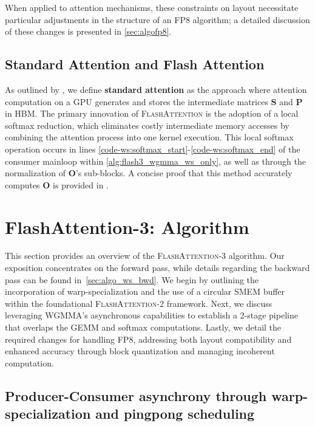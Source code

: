 When applied to attention mechanisms, these constraints on layout necessitate particular adjustments in the structure of an FP8 algorithm; a detailed discussion of these changes is presented in \cref{sec:algofp8}.

\subsection{Standard Attention and Flash Attention} As outlined by \citet{dao2022flashattention}, we define \textbf{standard attention} as the approach where attention computation on a GPU generates and stores the intermediate matrices $\mathbf{S}$ and $\mathbf{P}$ in HBM. The primary innovation of \textsc{FlashAttention} is the adoption of a local softmax reduction, which eliminates costly intermediate memory accesses by combining the attention process into one kernel execution. This local softmax operation occurs in lines \ref{code-ws:softmax_start}-\ref{code-ws:softmax_end} of the consumer mainloop within \cref{alg:flash3_wgmma_ws_only}, as well as through the normalization of $\mathbf{O}$’s sub-blocks. A concise proof that this method accurately computes $\mathbf{O}$ is provided in \cite[\S 2.3.1]{dao2023flashattention2}.

\section{FlashAttention-3: Algorithm}
\label{sec:algo}

This section provides an overview of the \textsc{FlashAttention-3} algorithm. Our exposition concentrates on the forward pass, while details regarding the backward pass can be found in~\cref{sec:algo_ws_bwd}. We begin by outlining the incorporation of warp-specialization and the use of a circular SMEM buffer within the foundational \textsc{FlashAttention-2} framework. Next, we discuss leveraging WGMMA’s asynchronous capabilities to establish a 2-stage pipeline that overlaps the GEMM and softmax computations. Lastly, we detail the required changes for handling FP8, addressing both layout compatibility and enhanced accuracy through block quantization and managing incoherent computation.

\subsection{Producer-Consumer asynchrony through warp-specialization and pingpong scheduling}
\label{sec:algo_ws}

